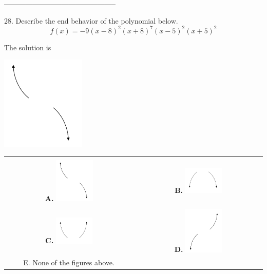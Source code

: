 \documentclass{extbook}[14pt]
\begin{document}
-----------------------------------------------

28. Describe the end behavior of the polynomial below.
\[ f(x) = -9(x - 8)^{2}(x + 8)^{7}(x - 5)^{2}(x + 5)^{2} \] 

 
 The solution is  
 \begin{center} \includegraphics[width=0.3\textwidth]{../Figures/polyEndBehaviorAB.png} \end{center}\begin{tabular}{|c|c|} 
\hline 
 & \tabularnewline 
 \textbf{A.} \includegraphics[width=0.3\textwidth]{../Figures/polyEndBehaviorAB.png} & \textbf{B.} \includegraphics[width=0.3\textwidth]{../Figures/polyEndBehaviorBB.png} \tabularnewline 
\hline 
 & \tabularnewline 
 \textbf{C.} \includegraphics[width=0.3\textwidth]{../Figures/polyEndBehaviorCB.png} & \textbf{D.} \includegraphics[width=0.3\textwidth]{../Figures/polyEndBehaviorDB.png} \tabularnewline 
\hline 
 E. None of the figures above. & \tabularnewline 
\hline 
 \end{tabular} 
 
\end{document}
